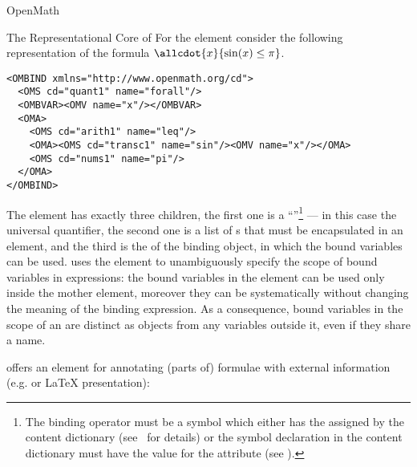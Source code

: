 \begin{omgroup}[id=mobj,short=Mathematical Objects]
\begin{omgroup}[id=openmath]{OpenMath}
\begin{module}[id=OpenMath]
\begin{omgroup}[id=om.core]{The Representational Core of {\openmath}}
For the  element consider the following representation of the
formula $\allcdot{x}{\sin(x)\leq\pi}$.
\begin{lstlisting}[label=allxsinx,language=OpenMath,numbers=none,
   index={OMA,OMV,OMBIND,OMBVAR}]
<OMBIND xmlns="http://www.openmath.org/cd">
  <OMS cd="quant1" name="forall"/>
  <OMBVAR><OMV name="x"/></OMBVAR>
  <OMA>
    <OMS cd="arith1" name="leq"/>
    <OMA><OMS cd="transc1" name="sin"/><OMV name="x"/></OMA>
    <OMS cd="nums1" name="pi"/>
  </OMA>
</OMBIND>
\end{lstlisting}
\begin{definition}[id=ombind.def]
  The {} element has exactly three children, the first one is a
  ``{}''\footnote{%
    The binding operator must be a symbol which either has the {}
    {} assigned by the {\openmath} content dictionary
    (see~\cite{BusCapCar:2oms04} for details) or the symbol declaration in the \omdoc
    content dictionary must have the value  for the
    attribute  (see {}).} --- in this case the
  universal quantifier, the second one is a list of {s} that must
  be encapsulated in an {} element, and the third is the
  {} of the binding object, in which the bound variables can be used.
  {\openmath} uses the  element to unambiguously specify the
  scope of bound variables in expressions: the bound variables in the
   element can be used only inside the mother
   element, moreover they can be systematically
   without changing the meaning of the binding
  expression. As a consequence, bound variables in the scope of an
   are distinct as {\openmath} objects from any variables
  outside it, even if they share a name.
\end{definition}

{\openmath} offers an element for annotating (parts of) formulae with external information
(e.g. {\mathml} or {\LaTeX} presentation): 


\end{omgroup}
\end{module}
\end{omgroup}
\end{omgroup}
